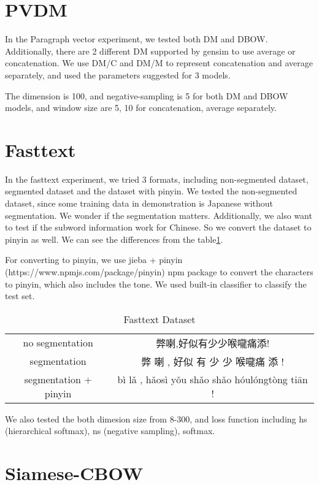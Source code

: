 \section{PVDM}

In the Paragraph vector experiment, we tested both DM and DBOW. Additionally, there are 2 different DM supported by gensim to use average or concatenation.
We use DM/C and DM/M to represent concatenation and average separately, and used the parameters suggested for 3 models. 

The dimension is 100, and negative-sampling is 5 for both DM and DBOW models, and window size are 5, 10 for concatenation, average separately. 

\section{Fasttext}

In the fasttext experiment, we tried 3 formats, including non-segmented dataset, segmented dataset and the dataset with pinyin.
We tested the non-segmented dataset, since some training data in demonstration is Japanese without segmentation. We wonder if the segmentation matters.
Additionally, we also want to test if the subword information work for Chinese. So we convert the dataset to pinyin as well. We can see the differences from the table\ref{ftdataset}.

For converting to pinyin, we use jieba + pinyin (https://www.npmjs.com/package/pinyin) npm package to convert the characters to pinyin, which also includes the tone.
We used built-in classifier to classify the test set.

\begin{table}[]
\centering
\caption{Fasttext Dataset}
\label{ftdataset}
\begin{tabular}{|c|c|}
\hline
   & \\
\hline
no segmentation  & 弊喇,好似有少少喉嚨痛添! \\
segmentation  & 弊 喇 , 好似 有 少 少 喉嚨痛 添 ! \\
segmentation + pinyin  & bì lǎ , hǎosì yǒu shǎo shǎo hóulóngtòng tiān ! \\
\hline
\end{tabular}
\end{table}

We also tested the both dimesion size from 8-300, and loss function including hs (hierarchical softmax), ns (negative sampling), softmax.


\section{Siamese-CBOW}

